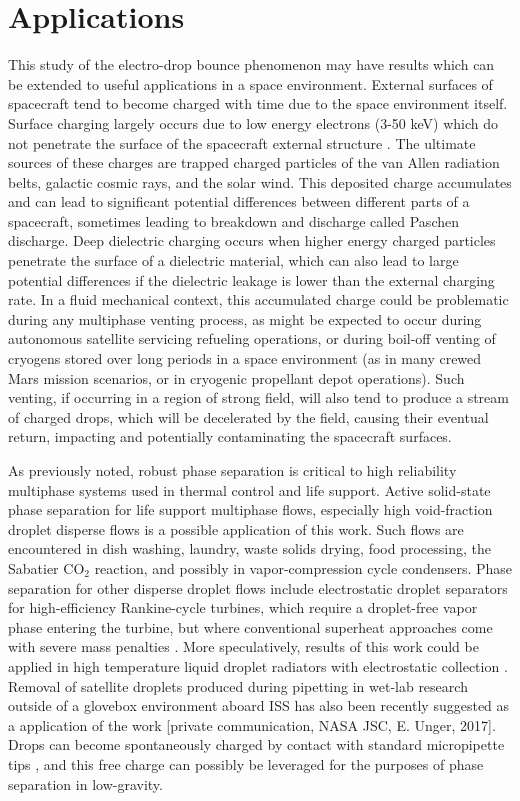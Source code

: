 \documentclass[12pt,a4paper,oneside]{book}
\begin{document}
\section{Applications}
This study of the electro-drop bounce phenomenon may have results which can be extended to useful applications in a space environment. External surfaces of spacecraft tend to become charged with time due to the space environment itself. Surface charging largely occurs due to low energy electrons (3-50 keV) which do not penetrate the surface of the spacecraft external structure \cite{czepiela_charging_1997}. The ultimate sources of these charges are trapped charged particles of the van Allen radiation belts, galactic cosmic rays, and the solar wind. This deposited charge accumulates and can lead to significant potential differences between different parts of a spacecraft, sometimes leading to breakdown and discharge called Paschen discharge. Deep dielectric charging occurs when higher energy charged particles penetrate the surface of a dielectric material, which can also lead to large potential differences if the dielectric leakage is lower than the external charging rate. In a fluid mechanical context, this accumulated charge could be problematic during any multiphase venting process, as might be expected to occur during autonomous satellite servicing refueling operations, or during boil-off venting of cryogens stored over long periods in a space environment (as in many crewed Mars mission scenarios, or in cryogenic propellant depot operations). Such venting, if occurring in a region of strong field, will also tend to produce a stream of charged drops, which will be decelerated by the field, causing their eventual return, impacting and potentially contaminating the spacecraft surfaces.

As previously noted, robust phase separation is critical to high reliability multiphase systems used in thermal control and life support. Active solid-state phase separation for life support multiphase flows, especially high void-fraction droplet disperse flows is a possible application of this work. Such flows are encountered in dish washing, laundry, waste solids drying, food processing, the Sabatier CO$_2$ reaction, and possibly in vapor-compression cycle condensers. Phase separation for other disperse droplet flows include electrostatic droplet separators for high-efficiency Rankine-cycle turbines, which require a droplet-free vapor phase entering the turbine, but where conventional superheat approaches come with severe mass penalties \cite{unterberg_zero_1962}. More speculatively, results of this work could be applied in high temperature liquid droplet radiators with electrostatic collection \cite{white_liquid_1987}. Removal of satellite droplets produced during pipetting in wet-lab research outside of a glovebox environment aboard ISS has also been recently suggested as a application of the work [private communication, NASA JSC, E. Unger, 2017]. Drops can become spontaneously charged by contact with standard micropipette tips \cite{choi_spontaneous_2013}, and this free charge can possibly be leveraged for the purposes of phase separation in low-gravity. 
\end{document}

